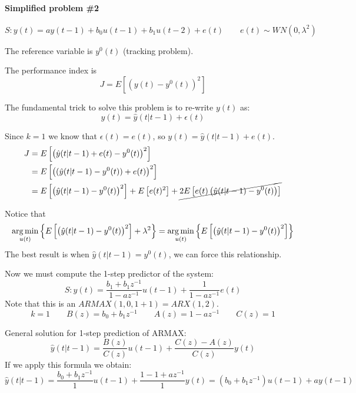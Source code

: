 \paragraph{Simplified problem \#2}
\[
    S: y(t) = ay(t-1) + b_0u(t-1) + b_1u(t-2) + e(t) \qquad e(t) \sim WN(0, \lambda^2)
\]

The reference variable is $y^0(t)$ (tracking problem).

The performance index is
\[
    J = E\left[ (y(t) - y^0(t))^2 \right]
\]

The fundamental trick to solve this problem is to re-write $y(t)$ as:
\[
    y(t) = \hat{y}(t|t-1) + \epsilon(t)
\]

Since $k=1$ we know that $\epsilon(t) = e(t)$, so $y(t) = \hat{y}(t|t-1)+e(t)$.
\begin{align*}
    J &= E\left[ \left(\hat{y}(t|t-1)+e(t) - y^0(t)\right)^2 \right] \\
    &= E\left[   \left((\hat{y}(t|t-1)-y^0(t)) +e(t)\right)^2 \right] \\
    &= E\left[ \left(\hat{y}(t|t-1)-y^0(t)\right)^2 \right] + E\left[e(t)^2\right] + \cancel{2E\left[e(t)\left( \hat{y}(t|t-1)-y^0(t) \right)\right]} \\
\end{align*}

Notice that
\[
    \operatorname*{arg\,min}_{u(t)} \left\{ E\left[ \left(\hat{y}(t|t-1)-y^0(t)\right)^2 \right] + \lambda^2 \right\} = \operatorname*{arg\,min}_{u(t)} \left\{ E\left[ \left(\hat{y}(t|t-1)-y^0(t)\right)^2 \right] \right\}
\]
The best result is when $\hat{y}(t|t-1)=y^0(t)$, we can force this relationship.

Now we must compute the 1-step predictor of the system:
\[
    S: y(t) = \frac{b_1+b_1z^{-1}}{1-az^{-1}}u(t-1) + \frac{1}{1-az^{-1}}e(t)
\]
Note that this is an $ARMAX(1,0,1+1)=ARX(1,2)$.
\[
    k=1 \qquad B(z) = b_0+b_1z^{-1} \qquad A(z)=1-az^{-1} \qquad C(z) = 1
\]

General solution for 1-step prediction of ARMAX:
\[
    \hat{y}(t|t-1) = \frac{B(z)}{C(z)}u(t-1) + \frac{C(z)-A(z)}{C(z)}y(t)
\]
If we apply this formula we obtain:
\[
    \hat{y}(t|t-1) = \frac{b_0+b_1z^{-1}}{1}u(t-1) + \frac{1-1+az^{-1}}{1}y(t) = (b_0+b_1z^{-1})u(t-1)+ay(t-1)
\]


